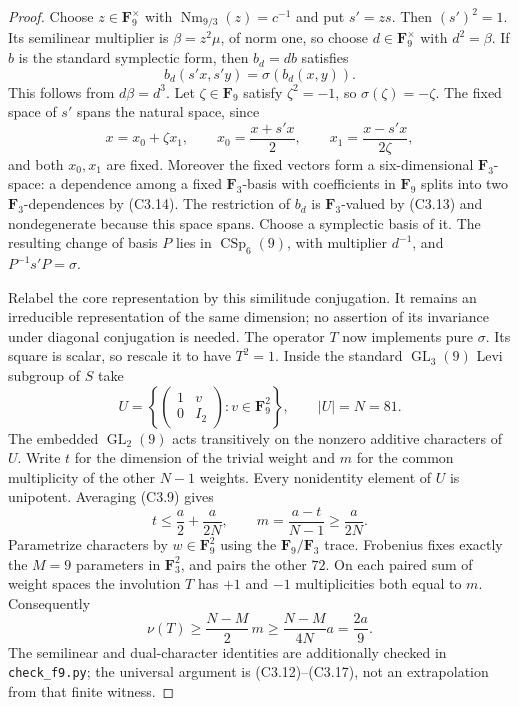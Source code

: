 \begin{proof}
Choose $z\in\mathbf F_9^\times$ with
$\operatorname{Nm}_{9/3}(z)=c^{-1}$ and put $s'=zs$.
Then $(s')^2=1$. Its semilinear multiplier is
$\beta=z^2\mu$, of norm one, so choose $d\in\mathbf F_9^\times$
with $d^2=\beta$. If $b$ is the standard symplectic form, then
$b_d=d b$ satisfies
\[
 b_d(s'x,s'y)=\sigma(b_d(x,y)).
                                                               \tag{C3.13}
\]
This follows from $d\beta=d^3$.
Let $\zeta\in\mathbf F_9$ satisfy $\zeta^2=-1$, so
$\sigma(\zeta)=-\zeta$. The fixed space of $s'$ spans the
natural space, since
\[
 x=x_0+\zeta x_1,\qquad
 x_0=\frac{x+s'x}{2},\qquad
 x_1=\frac{x-s'x}{2\zeta},
                                                               \tag{C3.14}
\]
and both $x_0,x_1$ are fixed. Moreover the fixed vectors form a
six-dimensional $\mathbf F_3$-space: a dependence among a fixed
$\mathbf F_3$-basis with coefficients in $\mathbf F_9$ splits
into two $\mathbf F_3$-dependences by (C3.14).
The restriction of $b_d$ is $\mathbf F_3$-valued by (C3.13)
and nondegenerate because this space spans. Choose a symplectic
basis of it. The resulting change of basis $P$ lies in
$\operatorname{CSp}_6(9)$, with multiplier $d^{-1}$, and
$P^{-1}s'P=\sigma$.

Relabel the core representation by this similitude conjugation.
It remains an irreducible representation of the same dimension;
no assertion of its invariance under diagonal conjugation is
needed. The operator $T$ now implements pure $\sigma$. Its
square is scalar, so rescale it to have $T^2=1$.
Inside the standard $\operatorname{GL}_3(9)$ Levi subgroup of
$S$ take
\[
 U=\left\{\begin{pmatrix}1&v\\0&I_2\end{pmatrix}:
              v\in\mathbf F_9^2\right\},\qquad |U|=N=81.
                                                               \tag{C3.15}
\]
The embedded $\operatorname{GL}_2(9)$ acts transitively on the
nonzero additive characters of $U$. Write $t$ for the dimension
of the trivial weight and $m$ for the common multiplicity of
the other $N-1$ weights. Every nonidentity element of $U$ is
unipotent. Averaging (C3.9) gives
\[
 t\le\frac a2+\frac a{2N},\qquad
              m=\frac{a-t}{N-1}\ge\frac a{2N}.
                                                               \tag{C3.16}
\]
Parametrize characters by $w\in\mathbf F_9^2$ using the
$\mathbf F_9/\mathbf F_3$ trace. Frobenius fixes exactly the
$M=9$ parameters in $\mathbf F_3^2$, and pairs the other
$72$. On each paired sum of weight spaces the involution $T$
has $+1$ and $-1$ multiplicities both equal to $m$.
Consequently
\[
 \nu(T)\ge\frac{N-M}{2}\,m
          \ge\frac{N-M}{4N}a=\frac{2a}{9}.
                                                               \tag{C3.17}
\]
The semilinear and dual-character identities are additionally
checked in \texttt{check\_f9.py}; the universal argument is
(C3.12)--(C3.17), not an extrapolation from that finite witness.


\end{proof}
